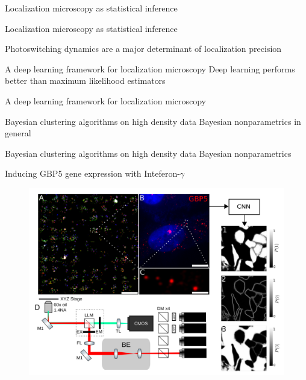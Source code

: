 \documentclass{beamer}					%
\begin{document}
\begin{frame}{Localization microscopy as statistical inference}
\end{frame}


\begin{frame}{Localization microscopy as statistical inference}
\end{frame}

\begin{frame}{Photoswitching dynamics are a major determinant of localization precision}
\end{frame}

\begin{frame}{A deep learning framework for localization microscopy}
Deep learning performs better than maximum likelihood estimators
\end{frame}

\begin{frame}{A deep learning framework for localization microscopy}
\end{frame}

\begin{frame}{Bayesian clustering algorithms on high density data}
Bayesian nonparametrics in general
\end{frame}

\begin{frame}{Bayesian clustering algorithms on high density data}
Bayesian nonparametrics
\end{frame}

\begin{frame}{Inducing GBP5 gene expression with Inteferon-$\gamma$}
\begin{figure}
\includegraphics[width=11.5cm]{Figure-1.png}
\end{figure}
\end{frame}
\end{document}
